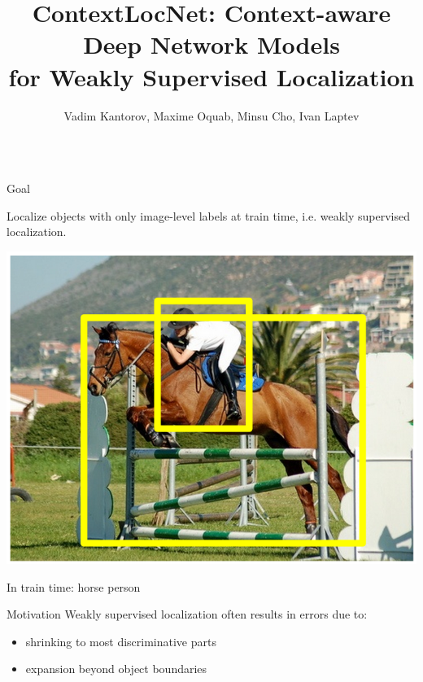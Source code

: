 \documentclass[final, xcolor={dvipsnames}]{beamer}
\title{ContextLocNet: Context-aware Deep Network Models \\for Weakly Supervised Localization}
\author{Vadim Kantorov, Maxime Oquab, Minsu Cho, Ivan Laptev}
\institute{INRIA / ENS, Paris}
\begin{document}
\begin{frame}[t,fragile]{} 
\begin{mdframed}[style = posterframe]

\leavevmode
\begin{columns}[t,onlytextwidth]

\begin{column}{.26\linewidth}
	 
	\begin{block}{Goal}
			\begin{center}
			Localize objects with only image-level labels at train time, i.e. weakly supervised localization.
			\end{center}
		\begin{center}
 			\includegraphics[width=.8\textwidth]{images/wsl}
			
			In train time: \textcolor{ForestGreen}{\checkmark} horse \textcolor{ForestGreen}{\checkmark}{person}
		\end{center}
	\end{block}

	\begin{block}{Motivation}
		Weakly supervised localization often results in errors due to:
		\begin{itemize}
			\item shrinking to most discriminative parts
			\item expansion beyond object boundaries
		\end{itemize}
		
	 \end{block}


\end{column}
\end{columns}
\end{mdframed}
\end{frame}
\end{document}
